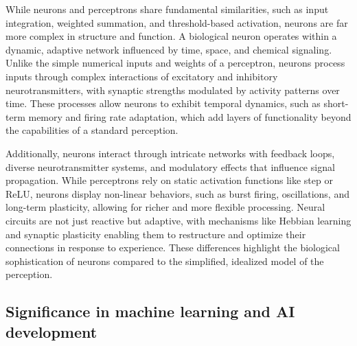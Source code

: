While neurons and perceptrons share fundamental similarities, such as input integration, weighted summation, and threshold-based activation, neurons are far more complex in structure and function. A biological neuron operates within a dynamic, adaptive network influenced by time, space, and chemical signaling. Unlike the simple numerical inputs and weights of a perceptron, neurons process inputs through complex interactions of excitatory and inhibitory neurotransmitters, with synaptic strengths modulated by activity patterns over time. These processes allow neurons to exhibit temporal dynamics, such as short-term memory and firing rate adaptation, which add layers of functionality beyond the capabilities of a standard perception.

Additionally, neurons interact through intricate networks with feedback loops, diverse neurotransmitter systems, and modulatory effects that influence signal propagation. While perceptrons rely on static activation functions like step or ReLU, neurons display non-linear behaviors, such as burst firing, oscillations, and long-term plasticity, allowing for richer and more flexible processing. Neural circuits are not just reactive but adaptive, with mechanisms like Hebbian learning and synaptic plasticity enabling them to restructure and optimize their connections in response to experience. These differences highlight the biological sophistication of neurons compared to the simplified, idealized model of the perception.

\subsection{Significance in machine learning and AI development}

